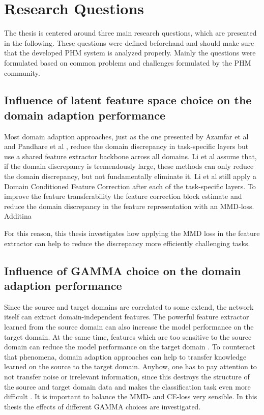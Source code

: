 \section{Research Questions}
The thesis is centered around three main research questions, which are presented in the following. These questions were defined beforehand and should make sure that the developed PHM system is analyzed properly. Mainly the questions were formulated based on common problems and challenges formulated by the PHM community. 

\subsection{Influence of latent feature space choice on the domain adaption performance}
Most domain adaption approaches, just as the one presented by Azamfar et al \cite{AZAMFAR2020103932} and Pandhare et al \cite{Pandhare2021}, reduce the domain discrepancy in task-specific layers but use a shared feature extractor backbone across all domains. Li et al \cite{li2020} assume that, if the domain discrepancy is tremendously large, these methods can only reduce the domain discrepancy, but not fundamentally eliminate it. Li et al still apply a Domain Conditioned Feature Correction after each of the task-specific layers. To improve the feature transferability the feature correction block estimate and reduce the domain discrepancy in the feature representation with an MMD-loss. Additina


For this reason, this thesis investigates how applying the MMD loss in the feature extractor can help to reduce the discrepancy more efficiently challenging tasks.

\subsection{Influence of GAMMA choice on the domain adaption performance}
Since the source and target domains are correlated to some extend, the network itself can extract domain-independent features. The powerful feature extractor learned from the source domain can also increase the model performance on the target domain. At the same time, features which are too sensitive to the source domain can reduce the model performance on the target domain \cite{li2020}. To counteract that phenomena, domain adaption approaches can help to transfer knowledge learned on the source to the target domain. Anyhow, one has to pay attention to not transfer noise or irrelevant information, since this destroys the structure of the source and target domain data and makes the classification task even more difficult \cite{li2020}. It is important to balance the MMD- and CE-loss very sensible. In this thesis the effects of different GAMMA choices are investigated.


